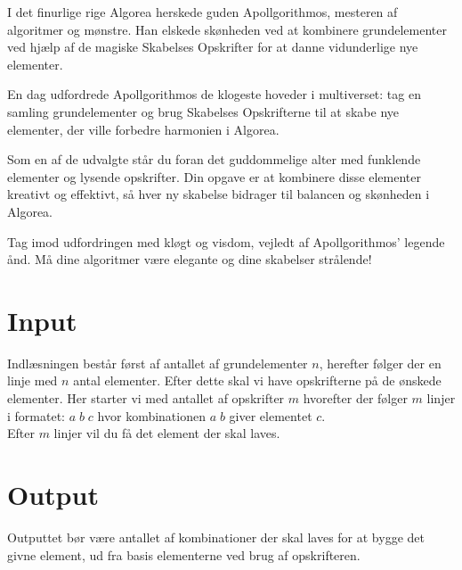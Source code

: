 I det finurlige rige Algorea herskede guden Apollgorithmos, mesteren af algoritmer og mønstre. Han elskede skønheden ved at kombinere grundelementer ved hjælp af de magiske Skabelses Opskrifter for at danne vidunderlige nye elementer.

En dag udfordrede Apollgorithmos de klogeste hoveder i multiverset: tag en samling grundelementer og brug Skabelses Opskrifterne til at skabe nye elementer, der ville forbedre harmonien i Algorea.

Som en af de udvalgte står du foran det guddommelige alter med funklende elementer og lysende opskrifter. Din opgave er at kombinere disse elementer kreativt og effektivt, så hver ny skabelse bidrager til balancen og skønheden i Algorea.

Tag imod udfordringen med kløgt og visdom, vejledt af Apollgorithmos' legende ånd. Må dine algoritmer være elegante og dine skabelser strålende!
\section*{Input}
Indlæsningen består først af antallet af grundelementer \(n\), herefter følger der en linje med \(n\) antal elementer.
Efter dette skal vi have opskrifterne på de ønskede elementer. Her starter vi med antallet af opskrifter \(m\) hvorefter der følger \(m\) linjer i formatet: \(a\;b\;c\) hvor kombinationen \(a\;b\) giver elementet \(c\).\\
Efter \(m\) linjer vil du få det element der skal laves.
\section*{Output}
Outputtet bør være antallet af kombinationer der skal laves for at bygge det givne element, ud fra basis elementerne ved brug af opskrifteren.
